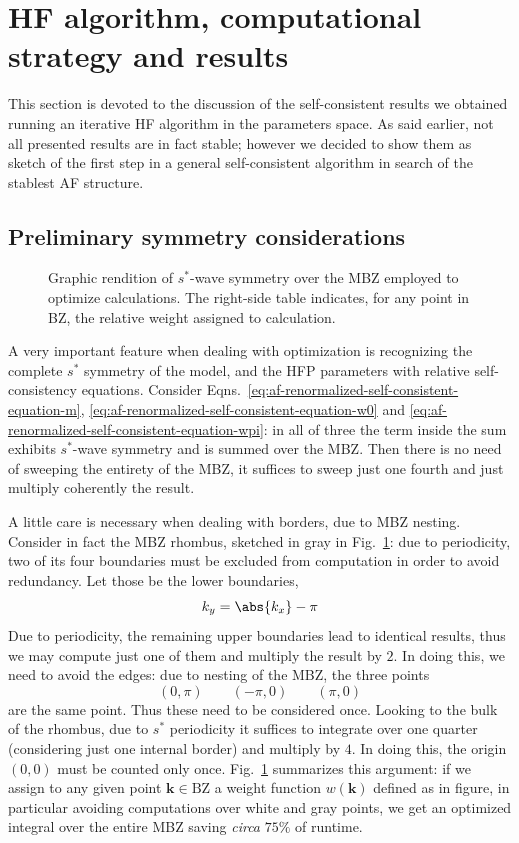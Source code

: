 \section{HF algorithm, computational strategy and results}

This section is devoted to the discussion of the self-consistent results we obtained running an iterative HF algorithm in the parameters space. As said earlier, not all presented results are in fact stable; however we decided to show them as sketch of the first step in a general self-consistent algorithm in search of the stablest AF structure.

\subsection{Preliminary symmetry considerations}

\begin{figure}
	\centering
	
	\caption{Graphic rendition of $s^*$-wave symmetry over the MBZ employed to optimize calculations. The right-side table indicates, for any point in BZ, the relative weight assigned to calculation.}
	\label{fig:af-mbz-s*-optimization}
\end{figure}

A very important feature when dealing with optimization is recognizing the complete $s^*$ symmetry of the model, and the HFP parameters with relative self-consistency equations. Consider Eqns.~\eqref{eq:af-renormalized-self-consistent-equation-m}, \eqref{eq:af-renormalized-self-consistent-equation-w0} and \eqref{eq:af-renormalized-self-consistent-equation-wpi}: in all of three the term inside the sum exhibits $s^*$-wave symmetry and is summed over the MBZ. Then there is no need of sweeping the entirety of the MBZ, it suffices to sweep just one fourth and just multiply coherently the result.

A little care is necessary when dealing with borders, due to MBZ nesting. Consider in fact the MBZ rhombus, sketched in gray in Fig.~\ref{fig:af-mbz-s*-optimization}: due to periodicity, two of its four boundaries must be excluded from computation in order to avoid redundancy. Let those be the lower boundaries,
\[
	k_y = \abs{k_x} - \pi
\]
Due to periodicity, the remaining upper boundaries lead to identical results, thus we may compute just one of them and multiply the result by $2$. In doing this, we need to avoid the edges: due to nesting of the MBZ, the three points
\[
	(0,\pi) \qquad (-\pi,0) \qquad (\pi,0)
\]
are the same point. Thus these need to be considered once. Looking to the bulk of the rhombus, due to $s^*$ periodicity it suffices to integrate over one quarter (considering just one internal border) and multiply by $4$. In doing this, the origin $(0,0)$ must be counted only once. Fig.~\ref{fig:af-mbz-s*-optimization} summarizes this argument: if we assign to any given point $\mathbf{k}\in\mathrm{BZ}$ a weight function $w(\mathbf{k})$ defined as in figure, in particular avoiding computations over white and gray points, we get an optimized integral over the entire MBZ saving \textit{circa} $75\%$ of runtime.

